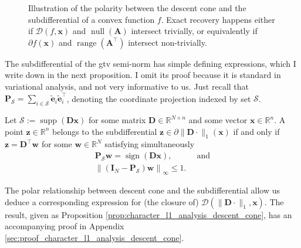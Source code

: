 \begin{figure}[H]
    \centering
    
    \caption[Polarity between descent cone and subdifferential]{Illustration of the polarity between the descent cone and the subdifferential of a convex function $f$. Exact recovery happens either if $\mathcal{D}(f, \mathbf{x})$ and $\operatorname{null} \left ( \mathbf{A} \right )$ intersect trivially, or equivalently if $\partial f(\mathbf{x})$ and $\operatorname{range} \left( \mathbf{A}^\top \right)$ intersect non-trivially.}
    \label{fig:illustration_descent_cone_subdifferential}
\end{figure}

The subdifferential of the \acrshort{gtv} semi-norm has simple defining expressions, which I write down in the next proposition. I omit its proof because it is standard in variational analysis, and not very informative to us. Just recall that $\mathbf{P}_{\mathcal{S}} = \sum_{i \in \mathcal{S}} \tilde{\mathbf{e}}_i \tilde{\mathbf{e}}_i^\top$, denoting the coordinate projection indexed by set $\mathcal{S}$.

\begin{proposition}\label{prop:character_subdifferential_l1}
    Let $\mathcal{S} := \operatorname{supp}\left ( \mathbf{Dx} \right )$ for some matrix $\mathbf{D} \in \mathbb{R}^{N \times n}$ and some vector $\mathbf{x} \in \mathbb{R}^{n}$. A point $\mathbf{z} \in \mathbb{R}^{n}$ belongs to the subdifferential $\mathbf{z} \in \partial \|\mathbf{D} \cdot \|_1 (\mathbf{x})$ if and only if $\mathbf{z} = \mathbf{D}^\top \mathbf{w}$ for some $\mathbf{w} \in \mathbb{R}^{N}$ satisfying simultaneously
    \begin{align}
        \mathbf{P}_{\mathcal{S}} \mathbf{w} = \operatorname{sign} \left ( \mathbf{Dx} \right ), & \enspace \text{and}\\
        \left \| \left ( \mathbf{I}_N - \mathbf{P}_\mathcal{S} \right ) \mathbf{w} \right \|_{\infty} \leq 1.
    \end{align}
\end{proposition}

The polar relationship between descent cone and the subdifferential allow us deduce a corresponding expression for (the closure of) $\mathcal{D}(\| \mathbf{D} \cdot \|_1, \mathbf{x})$. The result, given as Proposition \ref{prop:character_l1_analysis_descent_cone}, has an accompanying proof in Appendix \ref{sec:proof_character_l1_analysis_descent_cone}.

\clearpage

